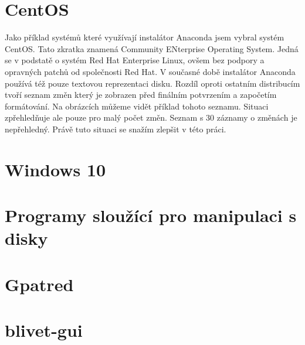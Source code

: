 \documentclass{article}
\begin{document}
\section{CentOS}

Jako příklad systémů které využívají instalátor Anaconda jsem vybral systém CentOS. Tato zkratka znamená Community ENterprise Operating System. Jedná se v podstatě o systém Red Hat Enterprise Linux, ovšem bez podpory a opravných patchů od společnosti Red Hat. V současné době instalátor Anaconda používá též pouze textovou reprezentaci disku. Rozdíl oproti ostatním distribucím tvoří seznam změn který je zobrazen před finálním potvrzením a započetím formátování. Na obrázcích můžeme vidět příklad tohoto seznamu. Situaci zpřehledňuje ale pouze pro malý počet změn. Seznam s 30 záznamy o změnách je nepřehledný. Právě tuto situaci se snažím zlepšit v této práci.

\section{Windows 10}

\section{Programy sloužící pro manipulaci s disky}

\section{Gpatred}

\section{blivet-gui}
\end{document}
